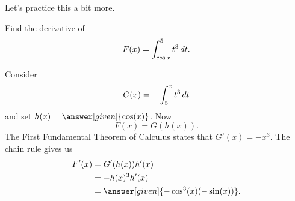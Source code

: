 \documentclass{ximera}
\begin{document}
Let's practice this a bit more.

\begin{example}
  Find the
  derivative of
  \[
  F(x) = \int_{\cos x}^5 t^3\mathop{}\!d t.
  \]
  \begin{explanation}
    Consider
    \[
    G(x) = - \int_5^x t^3 \mathop{}\!d t
    \]
    and set $h(x) = \answer[given]{\cos(x)}$. Now
    \[
    F(x) = G(h(x)).
    \]
    The First Fundamental Theorem of Calculus states that $G'(x) = -x^3$. The chain rule gives us
    \begin{align*}
      F'(x) &= G'(h(x))h'(x)\\
      &=-h(x)^3 h'(x)\\
      &=\answer[given]{-\cos^3(x) (-\sin(x))}.
    \end{align*}
  \end{explanation}
\end{example}
\end{document}
